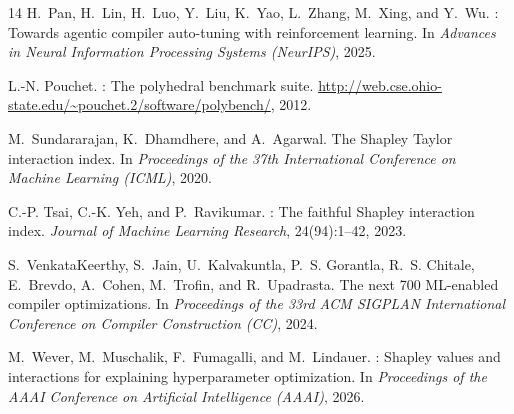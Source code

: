\documentclass[preprint]{article}
\begin{document}
\begin{thebibliography}{14}
H.~Pan, H.~Lin, H.~Luo, Y.~Liu, K.~Yao, L.~Zhang, M.~Xing, and Y.~Wu.
: Towards agentic compiler auto-tuning with reinforcement learning.
\newblock In \emph{Advances in Neural Information Processing Systems (NeurIPS)}, 2025.

L.-N. Pouchet.
: The polyhedral benchmark suite.
\newblock \url{http://web.cse.ohio-state.edu/~pouchet.2/software/polybench/}, 2012.

M.~Sundararajan, K.~Dhamdhere, and A.~Agarwal.
\newblock The {S}hapley {T}aylor interaction index.
\newblock In \emph{Proceedings of the 37th International Conference on Machine Learning (ICML)}, 2020.

C.-P. Tsai, C.-K. Yeh, and P.~Ravikumar.
: The faithful {S}hapley interaction index.
\newblock \emph{Journal of Machine Learning Research}, 24(94):1--42, 2023.

S.~VenkataKeerthy, S.~Jain, U.~Kalvakuntla, P.~S. Gorantla, R.~S. Chitale, E.~Brevdo, A.~Cohen, M.~Trofin, and R.~Upadrasta.
\newblock The next 700 {ML}-enabled compiler optimizations.
\newblock In \emph{Proceedings of the 33rd ACM SIGPLAN International Conference on Compiler Construction (CC)}, 2024.

M.~Wever, M.~Muschalik, F.~Fumagalli, and M.~Lindauer.
: {S}hapley values and interactions for explaining hyperparameter optimization.
\newblock In \emph{Proceedings of the AAAI Conference on Artificial Intelligence (AAAI)}, 2026.

\end{thebibliography}
\end{document}
